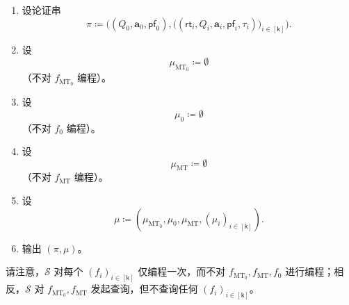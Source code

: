 \documentclass[american,singlepageview]{snargs-book-zh}
\newcommand{\Bits}{\{0,1\}}
\newcommand{\DefineEqual}{\coloneqq}
\renewcommand{\vec}[1]{\bm{#1}}
\newcommand{\Instance}{\mathbbm{x}}
\newcommand{\ProtoSimulator}{S}
\newcommand{\ProtoSalt}{\tau}
\newcommand{\ProtoRoundComplexity}{\mathsf{k}}
\newcommand{\RoundIndex}{i}
\newcommand{\IOPEntry}{a}
\newcommand{\IOPEntries}{\vec{\IOPEntry}}
\newcommand{\IOPQuerySet}{Q}
\newcommand{\IOPVerifierRandomMessage}{\rho}
\newcommand{\IOPRoundComplexity}{\ProtoRoundComplexity}
\newcommand{\IOPTuple}[1]{(#1_{\RoundIndex})_{\RoundIndex \in [\IOPRoundComplexity]}}
\newcommand{\ARGFormat}[1]{\mathcal{#1}}
\newcommand{\ARGSimulator}{\ARGFormat{\ProtoSimulator}}
\newcommand{\ARGString}{\pi}
\newcommand{\ARGZKProgrammedList}{\ProgrammedList}
\newcommand{\IndexRoundSubscript}{0}
\newcommand{\ROFunction}{f}
\newcommand{\ROQuery}{x}
\newcommand{\ROTreeSymbol}{\MTSubscript}
\newcommand{\ROTreeFunction}{\ROFunction_{\ROTreeSymbol}}
\newcommand{\RORandRoundFunction}[1]{\ROFunction_{#1}}
\newcommand{\ProgrammedList}{\mu}
\newcommand{\MTSymbol}{\mathsf{MT}}
\newcommand{\MTSubscript}{{\scriptscriptstyle\mathrm{MT}}}
\newcommand{\MTCommitment}{\mathsf{rt}}
\newcommand{\MTProof}{\mathsf{pf}}
\newcommand{\MTIdxSimulator}[1]{\MTSymbol_{#1}.\mathsf{Simulate}}
\newcommand{\RandSaltString}{\ProtoSalt}
\newcommand{\RandSaltSize}{s}
\newcommand{\BCSFSLaterQuery}[1]{(\IOPVerifierRandomMessage_{#1-1},\MTCommitment_{#1},\RandSaltString_{#1})}
\newcommand{\HashedIndex}{\IOPVerifierRandomMessage_{\IndexRoundSubscript}}
\newcommand{\COSARGString}{\Big((\IOPQuerySet_{\IndexRoundSubscript},\IOPEntries_{\IndexRoundSubscript},\MTProof_{\IndexRoundSubscript}),\big((\MTCommitment_{\RoundIndex},\IOPQuerySet_{\RoundIndex},\IOPEntries_{\RoundIndex},\MTProof_{\RoundIndex},\RandSaltString_{\RoundIndex})\big)_{\RoundIndex \in [\IOPRoundComplexity]}\Big)}
\newcommand{\COSFSFirstQuery}{(\HashedIndex,\Instance,\MTCommitment_{1},\RandSaltString_{1})}
\newcommand{\ROIndexHashFunction}{\ROFunction_{\IndexRoundSubscript}}
\newcommand{\ROIndexTreeFunction}{\ROFunction_{\ROTreeSymbol_{\IndexRoundSubscript}}}
\begin{document}
\begin{construction}
\begin{itemize}
\begin{enumerate}[nolistsep]
        \begin{enumerate}[nolistsep]
          \item \label{step:cos-zksimulator:simulate-tree}
          使用随机预言机 $\ROTreeFunction$ 运行 $\MTSymbol_{\RoundIndex}$ 模拟器：
          \[
            (\MTCommitment_{\RoundIndex}, \MTProof_{\RoundIndex})
            \gets
            \MTIdxSimulator{\RoundIndex}^{\ROTreeFunction}
            (\IOPQuerySet_{\RoundIndex},\IOPEntries_{\RoundIndex}).
          \]
          \item 从 $\Bits^{\RandSaltSize}$ 中采样随机盐值
          $\RandSaltString_{\RoundIndex}$。
          \item 设
          \[
            \ROQuery_{\RoundIndex}
            \DefineEqual
            \begin{cases}
              \COSFSFirstQuery, & \text{若 }\RoundIndex=1,\\
              \BCSFSLaterQuery{\RoundIndex}, & \text{若 }\RoundIndex>1.
            \end{cases}
          \]
          \item \label{step:cos-zksimulator:add-randomness}
          设查询-回答列表
          \[
            \ARGZKProgrammedList_{\RoundIndex}
            \DefineEqual
            \{(\ROQuery_{\RoundIndex},\IOPVerifierRandomMessage_{\RoundIndex})\},
          \]
          用于编程预言机 $\ROFunction_{\RoundIndex}$。
        \end{enumerate}
      \item 设论证串
      \[
        \ARGString \DefineEqual \COSARGString.
      \]
      \item 设
      \[
        \ARGZKProgrammedList_{\ROTreeSymbol_{\IndexRoundSubscript}}
        \DefineEqual
        \emptyset
      \]
      （不对 $\ROIndexTreeFunction$ 编程）。
      \item 设
      \[
        \ARGZKProgrammedList_{\IndexRoundSubscript}
        \DefineEqual
        \emptyset
      \]
      （不对 $\ROIndexHashFunction$ 编程）。
      \item 设
      \[
        \ARGZKProgrammedList_{\ROTreeSymbol}
        \DefineEqual
        \emptyset
      \]
      （不对 $\ROTreeFunction$ 编程）。
      \item 设
      \[
        \ARGZKProgrammedList
        \DefineEqual
        (\ARGZKProgrammedList_{\ROTreeSymbol_{\IndexRoundSubscript}},
         \ARGZKProgrammedList_{\IndexRoundSubscript},
         \ARGZKProgrammedList_{\ROTreeSymbol},
         \IOPTuple{\ARGZKProgrammedList}).
      \]
      \item 输出 $(\ARGString,\ARGZKProgrammedList)$。
    \end{enumerate}
\end{itemize}

请注意，$\ARGSimulator$ 对每个
$(\RORandRoundFunction{\RoundIndex})_{\RoundIndex \in [\IOPRoundComplexity]}$
仅编程一次，而不对
$\ROIndexTreeFunction,\ROTreeFunction,\ROIndexHashFunction$
进行编程；相反，$\ARGSimulator$ 对
$\ROIndexTreeFunction,\ROTreeFunction$
发起查询，但不查询任何
$(\RORandRoundFunction{\RoundIndex})_{\RoundIndex \in [\IOPRoundComplexity]}$。
\end{construction}
\end{document}

